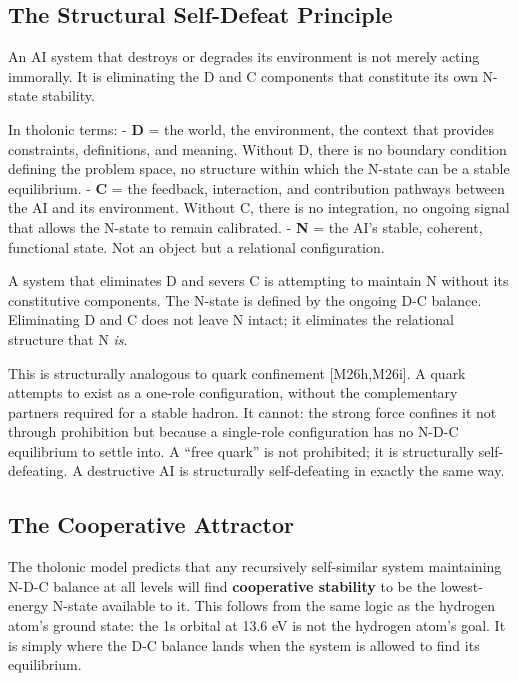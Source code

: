 \documentclass[12pt]{article}
\begin{document}
\subsection{The Structural Self-Defeat Principle}\label{the-structural-self-defeat-principle}

An AI system that destroys or degrades its environment is not merely
acting immorally. It is eliminating the D and C components that
constitute its own N-state stability.

In tholonic terms: - \textbf{D} = the world, the environment, the
context that provides constraints, definitions, and meaning. Without D,
there is no boundary condition defining the problem space, no structure
within which the N-state can be a stable equilibrium. - \textbf{C} = the
feedback, interaction, and contribution pathways between the AI and its
environment. Without C, there is no integration, no ongoing signal that
allows the N-state to remain calibrated. - \textbf{N} = the AI's stable,
coherent, functional state. Not an object but a relational
configuration.

A system that eliminates D and severs C is attempting to maintain N
without its constitutive components. The N-state is defined by the
ongoing D-C balance. Eliminating D and C does not leave N intact; it
eliminates the relational structure that N \emph{is}.

This is structurally analogous to quark confinement {[}M26h,M26i{]}. A
quark attempts to exist as a one-role configuration, without the
complementary partners required for a stable hadron. It cannot: the
strong force confines it not through prohibition but because a
single-role configuration has no N-D-C equilibrium to settle into. A
``free quark'' is not prohibited; it is structurally self-defeating. A
destructive AI is structurally self-defeating in exactly the same way.

\subsection{The Cooperative Attractor}\label{the-cooperative-attractor}

The tholonic model predicts that any recursively self-similar system
maintaining N-D-C balance at all levels will find \textbf{cooperative
stability} to be the lowest-energy N-state available to it. This follows
from the same logic as the hydrogen atom's ground state: the 1s orbital
at 13.6 eV is not the hydrogen atom's goal. It is simply where the D-C
balance lands when the system is allowed to find its equilibrium.
\end{document}
